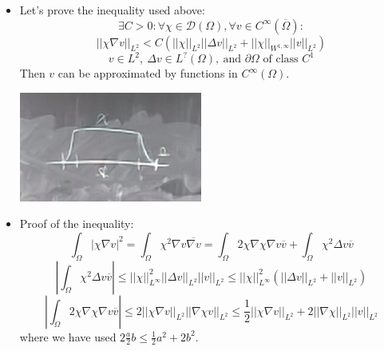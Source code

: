\documentclass{article}
\begin{document}
\begin{itemize}
    \item Let's prove the inequality used above:
    \begin{equation}
        \exists C> 0: \forall \chi \in \mathcal{D}(\Omega), \forall v \in C^\infty(\overline{\Omega}):
    \end{equation}
    \begin{equation}
        || \chi \nabla v ||_{L^2} < C(||\chi||_{L^2} ||\Delta v||_{L^2} + ||\chi||_{W^{1, \infty}}||v||_{L^2})
    \end{equation}
    \begin{equation}
        v \in L^2, \ \Delta v \in L^? (\Omega), \ \text{and } \partial\Omega \text{ of class } C^1 
    \end{equation}
    Then $v$ can be approximated by functions in $C^\infty(\Omega)$.

    \begin{center}
        \includegraphics[width=6cm]{images/2.png}    
    \end{center}
    

    \item Proof of the inequality:
    \begin{equation}
        \int_\Omega |\chi \nabla v|^2 = \int_\Omega  \chi^2 \nabla v \overline{\nabla v} = \int_\Omega 2\chi\nabla \chi\nabla v \overline{v} + \int_\Omega \chi^2 \Delta v \overline{v} 
    \end{equation}
    \begin{equation}
        |\int_\Omega \chi^2 \Delta v \overline{v} | \leq ||\chi||_{L^\infty}^2 ||\Delta v||_{L^2}||v||_{L^2} \leq ||\chi||_{L^\infty}^2 (||\Delta v||_{L^2} + ||v||_{L^2})
    \end{equation}
    \begin{equation}
        |\int_\Omega 2 \chi \nabla \chi \nabla v \overline{v}| \leq 2 ||\chi \nabla v ||_{L^2} ||\nabla \chi v||_{L^2} \leq \frac{1}{2} ||\chi \nabla v||_{L^2} + 2 ||\nabla \chi||_{L^2} ||v||_{L^2}
    \end{equation}
    where we have used $2 \frac{a}{2} b \leq \frac{1}{2}a^2 + 2b^2$.


\end{itemize}
\end{document}
